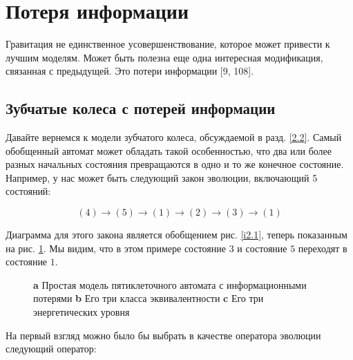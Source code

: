 \documentclass[main.tex]{subfiles}
\begin{document}
\section{Потеря информации}\label{ch7}

Гравитация не единственное усовершенствование, которое может привести к лучшим моделям. Может быть полезна еще одна интересная модификация, связанная с предыдущей. Это потери информации [9, 108].

\subsection{Зубчатые колеса с потерей информации}\label{ch7.1}

Давайте вернемся к модели зубчатого колеса, обсуждаемой в разд. \ref{2.2}. Самый обобщенный автомат может обладать такой особенностью, что два или более разных начальных состояния превращаются в одно и то же конечное состояние. Например, у нас может быть следующий закон эволюции, включающий 5 состояний:

\begin{equation}\label{7.1}
	(4) \rightarrow (5) \rightarrow (1) \rightarrow (2) \rightarrow (3) \rightarrow (1)
\end{equation}
                                                                                 
Диаграмма для этого закона является обобщением рис. \ref{i2.1}, теперь показанным на рис. \ref{i7.1}. Мы видим, что в этом примере состояние $3$ и состояние $5$ переходят в состояние $1$.

\begin{figure}[ht]
\begin{center}
\caption{
\label{i7.1}\textbf{a} Простая модель пятиклеточного автомата с информационными потерями \textbf{b} Его три класса эквивалентности \textbf{c} Его три энергетических уровня}
\end {center}
\end {figure}

На первый взгляд можно было бы выбрать в качестве оператора эволюции следующий оператор:
\end{document}
